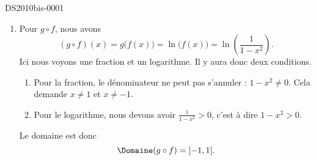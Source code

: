 \begin{corrige}{DS2010bis-0001}
\begin{enumerate}
\begin{enumerate}
				\item
					Pour $g\circ f$, nous avons
					\begin{equation}
						(g\circ f)(x)=g\big( f(x) \big)=\ln\big( f(x) \big)=\ln\left( \frac{1}{ 1-x^2 } \right).
					\end{equation}
					Ici nous voyons une fraction et un logarithme. Il y aura donc deux conditions.
					\begin{enumerate}
						\item
							Pour la fraction, le dénominateur ne peut pas s'annuler : $1-x^2\neq 0$. Cela demande $x\neq 1$ et $x\neq -1$.
						\item
							Pour le logarithme, nous devons avoir $\frac{1}{ 1-x^2 }>0$, c'est à dire $1-x^2>0$. 
					\end{enumerate}
					Le domaine est donc
					\begin{equation}
						\Domaine(g\circ f)=\mathopen] -1 , 1 \mathclose[.
					\end{equation}
			\end{enumerate}
			
	\end{enumerate}

\end{corrige}
